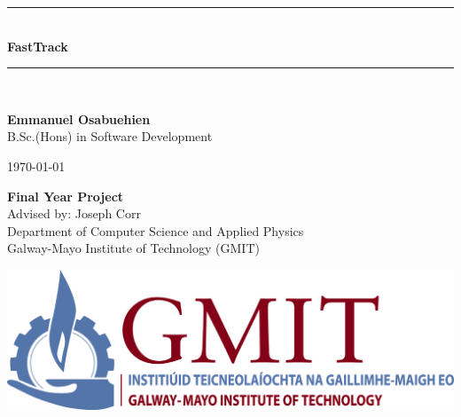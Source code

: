 \documentclass[12pt,a4paper,oneside,openany]{book}
\newcommand{\projecttitle}{FastTrack}
\newcommand{\projectauthor}{Emmanuel Osabuehien \\[0.2cm]}
\newcommand{\projectadvisor}{Joseph Corr \setcounter{page}{2} \\[0.2cm]}
\newcommand{\projectprogramme}{B.Sc.(Hons) in Software Development}
\newcommand{\projectdate}{\today}
\begin{document}
  \begin{titlepage}
    \begin{minipage}[t][6cm]{\textwidth}
      \centering
      \rule{\linewidth}{0.5mm} \\[0.4cm]
      { \LARGE \bfseries \projecttitle \\[0.4cm] }
      \rule{\linewidth}{0.5mm} \\[0.8cm]
    \end{minipage}
    
    \begin{minipage}[t][6.5cm]{\textwidth}
      \centering
      \textbf{\projectauthor}
      \projectprogramme
    \end{minipage}
  
    \begin{minipage}[t][1cm]{\textwidth}
      \centering
      \textsc{\projectdate}
    \end{minipage}
      
    \begin{minipage}[t][3cm]{\textwidth}
      \centering
      \textbf{Final Year Project}\\
      Advised by: \projectadvisor 
      Department of Computer Science and Applied Physics\\
      Galway-Mayo Institute of Technology (GMIT)
    \end{minipage}

    \begin{center}    
      \includegraphics{img/gmit-logo.jpg}
    \end{center}
  \end{titlepage}
  \setcounter{page}{2}
  \tableofcontents
  
  
  
\end{document}
